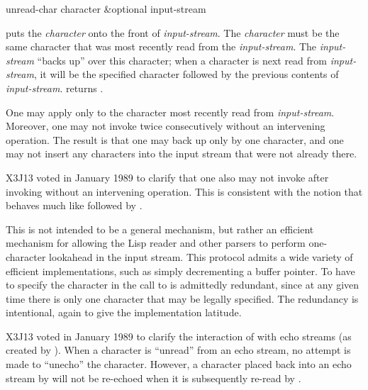 \begin{defun}[Function]
unread-char character &optional input-stream

 puts the \emph{character} onto the front of \emph{input-stream}.
The \emph{character} must be the same character that was most recently read
from the \emph{input-stream}.  The \emph{input-stream} ``backs up'' over this
character; when a character is next read from \emph{input-stream}, it will
be the specified character followed by the previous contents of
\emph{input-stream}.   returns {\false}.

One may apply  only to the character most recently
read from \emph{input-stream}.  Moreover, one may not invoke 
twice consecutively without an intervening 
operation.  The result is that one may back up only by one character,
and one may not insert any characters into the input stream that were not already there.

\begin{new}
X3J13 voted in January 1989
to clarify that one also may not invoke
 after invoking  without an intervening
 operation.  This is consistent with the notion that
 behaves much like  followed by .
\end{new}

\beforenoterule
\begin{rationale}
This is not intended to be a general mechanism, but rather
an efficient mechanism for allowing the Lisp reader and other parsers
to perform one-character lookahead in the input stream.
This protocol admits a wide variety of efficient implementations,
such as simply decrementing a buffer pointer.
To have to specify the character in the call to  is
admittedly redundant, since at any given time there is only one character
that may be legally specified.  The redundancy is intentional,
again to give the implementation latitude.
\end{rationale}
\afternoterule

\begin{new}
X3J13 voted in January 1989
to clarify the interaction of  with echo streams
(as created by ).  When a character is ``unread'' from an echo
stream, no attempt is made to ``unecho'' the character.  However, a character
placed back into an echo stream by  will not be re-echoed
when it is subsequently re-read by .
\end{new}
\end{defun}

